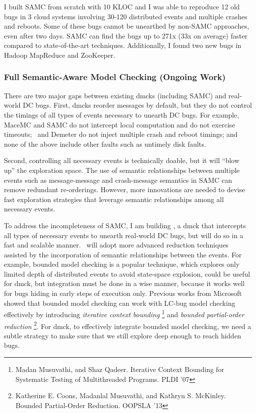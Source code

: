 \documentclass[11pt]{article}
\begin{document}
I built SAMC from scratch with 10 KLOC and I was able to reproduce 12 old bugs
in 3 cloud systems involving 30-120 distributed events and multiple crashes and
reboots. Some of these bugs cannot be unearthed by non-SAMC approaches, even
after two days. SAMC can find the bugs up to 271x (33x on average) faster
compared to state-of-the-art techniques. Additionally, I found two new bugs in
Hadoop MapReduce and ZooKeeper.

\subsubsection{Full Semantic-Aware Model Checking (Ongoing Work)} 

There are two major gaps between existing dmcks (including SAMC) and real-world
DC bugs. First, dmcks reorder messages by default, but they do not control the
timings of all types of events necessary to unearth DC bugs. For example, MaceMC
and SAMC do not intercept local computation and do not exercise timeouts;
\modist\ and Demeter do not inject multiple crash and reboot timings; and none
of the above include other faults such as untimely disk faults.

Second, controlling all necessary events is technically doable, but it will
``blow up'' the exploration space. The use of semantic relationships between
multiple events such as message-message and crash-message semantics in SAMC can
remove redundant re-orderings. However, more innovations are needed to devise
fast exploration strategies that leverage semantic relationships among all
necessary events.

To address the incompleteness of SAMC, I am building \fullcheck, a dmck that
intercepts all types of necessary events to unearth real-world DC bugs, but will
do so in a fast and scalable manner. \fullcheck\ will adopt more advanced
reduction techniques assisted by the incorporation of semantic relationships
between the events. For example, bounded model checking is a popular technique,
which explores only limited depth of distributed events to avoid state-space
explosion, could be useful for dmck, but integration must be done in a wise
manner, because it works well for bugs hiding in early steps of execution only.
Previous works from Microsoft showed that bounded model checking can work with
LC-bug model checking effectively by introducing \textit{iterative context
bounding} \footnote{Madan Musuvathi, and Shaz Qadeer. Iterative Context Bounding
for Systematic Testing of Multithreaded Programs. PLDI '07} and \textit{bounded
partial-order reduction} \footnote{Katherine E. Coons, Madanlal Musuvathi, and
Kathryn S. McKinley. Bounded Partial-Order Reduction. OOPSLA '13}. For dmck, to
effectively integrate bounded model checking, we need a subtle strategy to make
sure that we still explore deep enough to reach hidden bugs.
\end{document}
